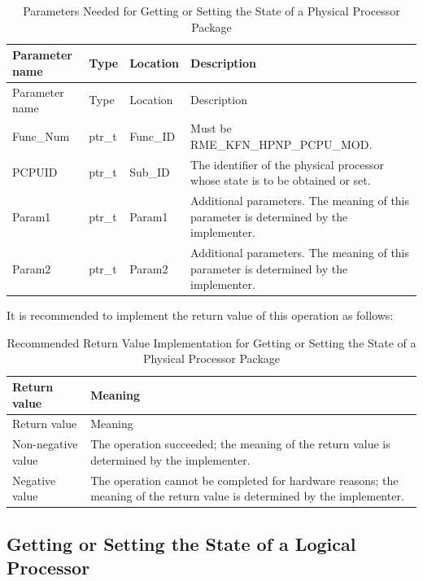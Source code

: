 \begin{xltabular}{\textwidth}{@{}>{\hsize\raggedright\arraybackslash}X>{\hsize\raggedright\arraybackslash}X>{\hsize\raggedright\arraybackslash}X>{\hsize\raggedright\arraybackslash}X@{}}
\caption{Parameters Needed for Getting or Setting the State of a Physical Processor Package}\label{tab:8-36-get-or-set-physical-processor-package-state-parameters}\\
\toprule
Parameter name & Type & Location & Description\tabularnewline
\endfirsthead
\toprule
Parameter name & Type & Location & Description\tabularnewline
\midrule
\endhead
\bottomrule
\endlastfoot
Func\_Num & ptr\_t & Func\_ID & Must be RME\_KFN\_HPNP\_PCPU\_MOD.\tabularnewline
PCPUID & ptr\_t & Sub\_ID &
The identifier of the physical processor whose state is to be obtained or set.\tabularnewline
Param1 & ptr\_t & Param1 &
Additional parameters. The meaning of this parameter is determined by the implementer.\tabularnewline
Param2 & ptr\_t & Param2 &
Additional parameters. The meaning of this parameter is determined by the implementer.\tabularnewline
\end{xltabular}
\nopagebreak[4]

It is recommended to implement the return value of this operation as follows:

\begin{xltabular}{\textwidth}{@{}>{\hsize\raggedright\arraybackslash}X>{\hsize\raggedright\arraybackslash}X@{}}
\caption{Recommended Return Value Implementation for Getting or Setting the State of a Physical Processor Package}\label{tab:8-37-get-or-set-physical-processor-package-state-suggested-return-values}\\
\toprule
Return value & Meaning\tabularnewline
\endfirsthead
\toprule
Return value & Meaning\tabularnewline
\midrule
\endhead
\bottomrule
\endlastfoot
    Non-negative value & The operation succeeded; the meaning of the return value is determined by the implementer.\tabularnewline
    Negative value & The operation cannot be completed for hardware reasons; the meaning of the return value is determined by the implementer.\tabularnewline
\end{xltabular}
\nopagebreak[4]

\subsection{Getting or Setting the State of a Logical Processor}\label{subsec:8-get-or-set-logical-processor-state}

